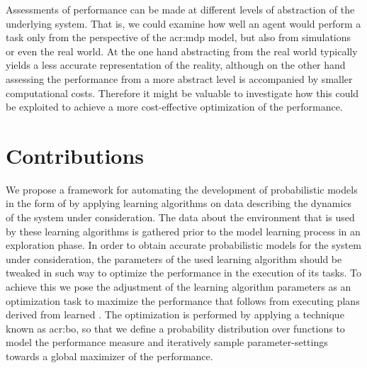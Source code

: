 Assessments of performance can be made at different levels of abstraction of the underlying system.
That is, we could examine how well an agent would perform a task only from the perspective of the \acrshort{acr:mdp} model, but also
from simulations or even the real world.
At the one hand abstracting from the real world typically yields a less accurate representation of the reality, although on the other hand assessing the performance from a more abstract level is accompanied by smaller computational costs.
Therefore it might be valuable to investigate how this could be exploited to achieve a more cost-effective optimization of the performance.


\section{Contributions}
\label{sec:contribution}

We propose a framework for automating the development of probabilistic models in the form of  by applying learning algorithms on data describing the dynamics of the system under consideration.
The data about the environment that is used by these learning algorithms is gathered prior to the model learning process in an exploration phase.
In order to obtain accurate probabilistic models for the system under consideration, the parameters of the used learning algorithm should be tweaked in such way to optimize the performance in the execution of its tasks.
To achieve this we pose the adjustment of the learning algorithm parameters as an optimization task to maximize the performance that follows from executing plans derived from learned .
The optimization is performed by applying a technique known as \acrlong{acr:bo}, so that we define a probability distribution over functions to model the performance measure and iteratively sample parameter-settings towards a global maximizer of the performance.

